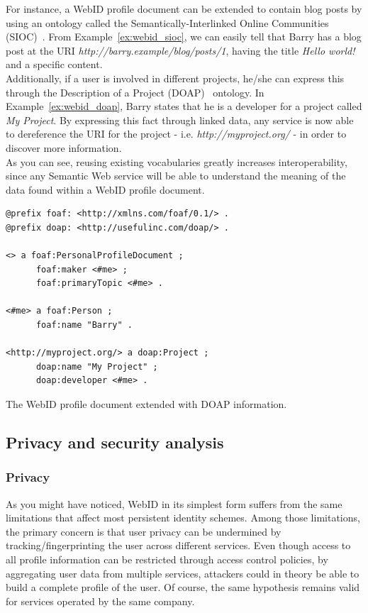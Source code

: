 For instance, a WebID profile document can be extended to contain blog posts by using an ontology called the Semantically-Interlinked Online Communities (SIOC)~\cite{breslin2005towards}. From Example~\ref{ex:webid_sioc}, we can easily tell that Barry has a blog post at the URI \textit{http://barry.example/blog/posts/1}, having the title \textit{Hello world!} and a specific content.\\

Additionally, if a user is involved in different projects, he/she can express this through the Description of a Project (DOAP)~\cite{dumbill2012doap} ontology. In Example~\ref{ex:webid_doap}, Barry states that he is a developer for a project called \textit{My Project}. By expressing this fact through linked data, any service is now able to dereference the URI for the project - i.e. \textit{http://myproject.org/} - in order to discover more information.\\

As you can see, reusing existing vocabularies greatly increases interoperability, since any Semantic Web service will be able to understand the meaning of the data found within a WebID profile document.

\begin{example}
\begin{verbatim}
@prefix foaf: <http://xmlns.com/foaf/0.1/> .
@prefix doap: <http://usefulinc.com/doap/> .

<> a foaf:PersonalProfileDocument ;
      foaf:maker <#me> ;
      foaf:primaryTopic <#me> .

<#me> a foaf:Person ; 
      foaf:name "Barry" .

<http://myproject.org/> a doap:Project ;
      doap:name "My Project" ;
      doap:developer <#me> .
\end{verbatim}
\caption{The WebID profile document extended with DOAP information.}
\label{ex:webid_doap}
\end{example}


\subsection{Privacy and security analysis}
\label{subsec:webid_limitations}

\subsubsection{Privacy}
As you might have noticed, WebID in its simplest form suffers from the same limitations that affect most persistent identity schemes. Among those limitations, the primary concern is that user privacy can be undermined by tracking/fingerprinting the user across different services. Even though access to all profile information can be restricted through access control policies, by aggregating user data from multiple services, attackers could in theory be able to build a complete profile of the user. Of course, the same hypothesis remains valid for services operated by the same company.\\

